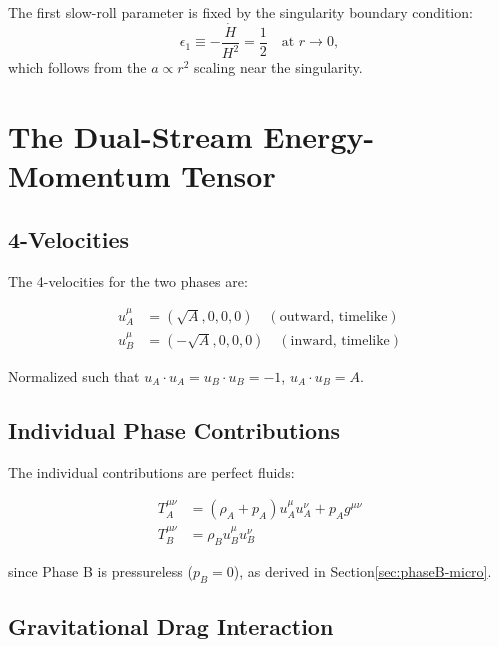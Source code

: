 \documentclass[10pt,twocolumn]{article}
\theoremstyle{definition}
\newcommand{\rhoA}{\rho_{A}}
\newcommand{\rhoB}{\rho_{B}}
\begin{document}
The first slow-roll parameter is fixed by the singularity boundary condition:
\begin{equation}
  \epsilon_{1} \equiv -\frac{\dot{H}}{H^{2}} = \frac{1}{2} \quad \text{at } r\to 0,
  \label{eq:eps1-derived}
\end{equation}
which follows from the \(a\propto r^{2}\) scaling near the singularity.



\section{The Dual-Stream Energy-Momentum Tensor}
\label{sec:emt}

\subsection{4-Velocities}

The 4-velocities for the two phases are:

\begin{align}
  u_{A}^{\mu} &= (\sqrt{A}, 0, 0, 0) \quad (\text{outward, timelike}) \\
  u_{B}^{\mu} &= (-\sqrt{A}, 0, 0, 0) \quad (\text{inward, timelike})
\end{align}

Normalized such that \( u_{A} \cdot u_{A} = u_{B} \cdot u_{B} = -1 \), \( u_{A} \cdot u_{B} = A \).

\subsection{Individual Phase Contributions}

The individual contributions are perfect fluids:

\begin{align}
  T_{A}^{\mu\nu} &= (\rhoA + p_{A}) u_{A}^{\mu} u_{A}^{\nu} + p_{A} g^{\mu\nu} \\
  T_{B}^{\mu\nu} &= \rhoB u_{B}^{\mu} u_{B}^{\nu}
\end{align}

since Phase B is pressureless (\( p_{B} = 0 \)), as derived in Section\nobreakspace{}\ref{sec:phaseB-micro}.




\subsection{Gravitational Drag Interaction}
\label{sec:drag-micro}
\end{document}

